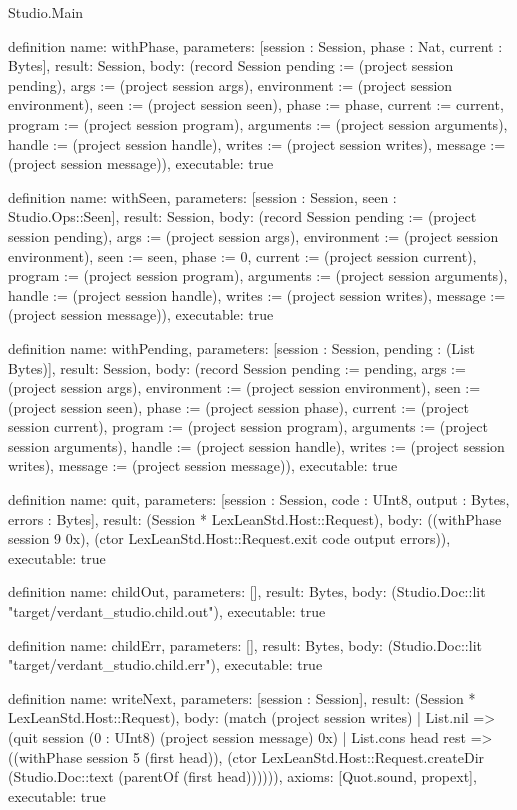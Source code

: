 \begin{lexlean}{Studio.Main}
\begin{semanticmodule}
definition{
  name: withPhase,
  parameters: [session : Session, phase : Nat, current : Bytes],
  result: Session,
  body: (record Session {pending := (project session pending), args := (project session args), environment := (project session environment), seen := (project session seen), phase := phase, current := current, program := (project session program), arguments := (project session arguments), handle := (project session handle), writes := (project session writes), message := (project session message)}),
  executable: true
}

definition{
  name: withSeen,
  parameters: [session : Session, seen : Studio.Ops::Seen],
  result: Session,
  body: (record Session {pending := (project session pending), args := (project session args), environment := (project session environment), seen := seen, phase := 0, current := (project session current), program := (project session program), arguments := (project session arguments), handle := (project session handle), writes := (project session writes), message := (project session message)}),
  executable: true
}

definition{
  name: withPending,
  parameters: [session : Session, pending : (List Bytes)],
  result: Session,
  body: (record Session {pending := pending, args := (project session args), environment := (project session environment), seen := (project session seen), phase := (project session phase), current := (project session current), program := (project session program), arguments := (project session arguments), handle := (project session handle), writes := (project session writes), message := (project session message)}),
  executable: true
}


definition{
  name: quit,
  parameters: [session : Session, code : UInt8, output : Bytes, errors : Bytes],
  result: (Session * LexLeanStd.Host::Request),
  body: ((withPhase session 9 0x), (ctor LexLeanStd.Host::Request.exit code output errors)),
  executable: true
}

definition{
  name: childOut,
  parameters: [],
  result: Bytes,
  body: (Studio.Doc::lit "target/verdant_studio.child.out"),
  executable: true
}

definition{
  name: childErr,
  parameters: [],
  result: Bytes,
  body: (Studio.Doc::lit "target/verdant_studio.child.err"),
  executable: true
}

definition{
  name: writeNext,
  parameters: [session : Session],
  result: (Session * LexLeanStd.Host::Request),
  body: (match (project session writes)
    | List.nil => (quit session (0 : UInt8) (project session message) 0x)
    | List.cons head rest => ((withPhase session 5 (first head)), (ctor LexLeanStd.Host::Request.createDir (Studio.Doc::text (parentOf (first head)))))),
  axioms: [Quot.sound, propext],
  executable: true
}


\end{semanticmodule}
\end{lexlean}
